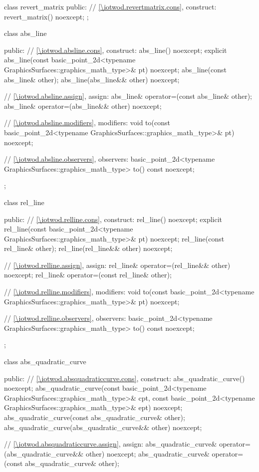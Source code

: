 \begin{codeblock}
{{    class revert_matrix {
    public:
      // \ref{\iotwod.revertmatrix.cons}, construct:
      revert_matrix() noexcept;
    };

    class abs_line {
    public:
      // \ref{\iotwod.absline.cons}, construct:
      abs_line() noexcept;
      explicit abs_line(const basic_point_2d<typename
        GraphicsSurfaces::graphics_math_type>& pt) noexcept;
      abs_line(const abs_line& other);
      abs_line(abs_line&& other) noexcept;

      // \ref{\iotwod.absline.assign}, assign:
      abs_line& operator=(const abs_line& other);
      abs_line& operator=(abs_line&& other) noexcept;

      // \ref{\iotwod.absline.modifiers}, modifiers:
      void to(const basic_point_2d<typename GraphicsSurfaces::graphics_math_type>& pt) noexcept;

      // \ref{\iotwod.absline.observers}, observers:
      basic_point_2d<typename GraphicsSurfaces::graphics_math_type> to() const noexcept;
    };

    class rel_line {
    public:
      // \ref{\iotwod.relline.cons}, construct:
      rel_line() noexcept;
      explicit rel_line(const basic_point_2d<typename
        GraphicsSurfaces::graphics_math_type>& pt) noexcept;
      rel_line(const rel_line& other);
      rel_line(rel_line&& other) noexcept;

      // \ref{\iotwod.relline.assign}, assign:
      rel_line& operator=(rel_line&& other) noexcept;
      rel_line& operator=(const rel_line& other);

      // \ref{\iotwod.relline.modifiers}, modifiers:
      void to(const basic_point_2d<typename GraphicsSurfaces::graphics_math_type>& pt) noexcept;

      // \ref{\iotwod.relline.observers}, observers:
      basic_point_2d<typename GraphicsSurfaces::graphics_math_type> to() const noexcept;
    };

    class abs_quadratic_curve {
    public:
      // \ref{\iotwod.absquadraticcurve.cons}, construct:
      abs_quadratic_curve() noexcept;
      abs_quadratic_curve(const basic_point_2d<typename
        GraphicsSurfaces::graphics_math_type>& cpt, const basic_point_2d<typename
        GraphicsSurfaces::graphics_math_type>& ept) noexcept;
      abs_quadratic_curve(const abs_quadratic_curve& other);
      abs_quadratic_curve(abs_quadratic_curve&& other) noexcept;

      // \ref{\iotwod.absquadraticcurve.assign}, assign:
      abs_quadratic_curve& operator=(abs_quadratic_curve&& other) noexcept;
      abs_quadratic_curve& operator=(const abs_quadratic_curve& other);

}}}
\end{codeblock}
